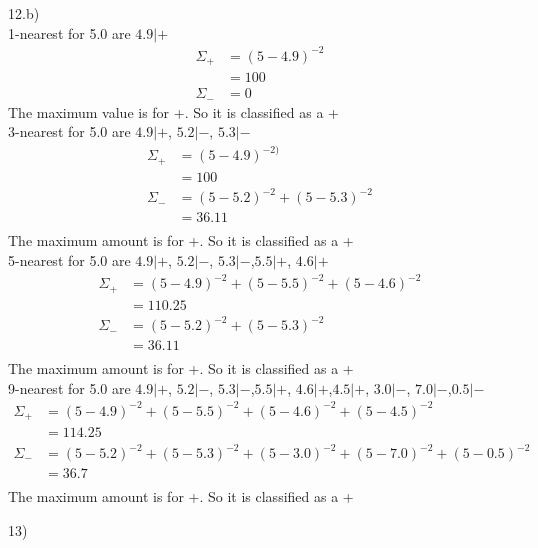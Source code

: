 \documentclass[12pt,english]{article}
\begin{document}
12.b)\\
1-nearest for 5.0 are $4.9 | +$
\begin{equation*}
\begin{split}
\Sigma_+ &= ( 5 -4.9 )^{-2}\\
&= 100\\
\Sigma_- &= 0
\end{split}
\end{equation*}
The maximum value is for +. So it is classified as a +\\
3-nearest for 5.0 are $4.9 | +$, $5.2 | -$, $5.3 | -$
\begin{equation*}
\begin{split}
\Sigma_+ &= ( 5 - 4.9 )^{-2)}\\
&= 100\\
\Sigma_- &= ( 5 - 5.2 )^{-2} +( 5 - 5.3 )^{-2}\\
&= 36.11\\
\end{split}
\end{equation*}
The maximum amount is for +. So it is classified as a +\\
5-nearest for 5.0 are $4.9 | +$, $5.2 | -$, $5.3 | -$,$5.5 | +$, $4.6 | +$
\begin{equation*}
\begin{split}
\Sigma_+ &= ( 5 - 4.9 )^{-2} +( 5 - 5.5 )^{-2} +( 5 - 4.6 )^{-2}\\
&= 110.25\\
\Sigma_- &= ( 5 - 5.2 )^{-2} +( 5 - 5.3 )^{-2}\\
&= 36.11\\
\end{split}
\end{equation*}
The maximum amount is for +. So it is classified as a +\\
9-nearest for 5.0 are $4.9 | +$, $5.2 | -$, $5.3 | -$,$5.5 | +$, $4.6 | +$,$4.5 | +$, $3.0 | -$, $7.0 | -$,$0.5 | -$
\begin{equation*}
\begin{split}
\Sigma_+ &= ( 5 - 4.9 )^{-2} +( 5 - 5.5 )^{-2} +( 5 - 4.6 )^{-2}+( 5 - 4.5 )^{-2}\\
&= 114.25\\
\Sigma_- &= ( 5 - 5.2 )^{-2} +( 5 - 5.3 )^{-2}+( 5 - 3.0 )^{-2}+( 5 - 7.0 )^{-2}+( 5 - 0.5 )^{-2}\\
&= 36.7\\
\end{split}
\end{equation*}
The maximum amount is for +. So it is classified as a +
\par
13)\\
\par
\end{document}
